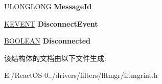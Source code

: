 \begin{DoxyCompactItemize}
\item 
\mbox{\label{struct___f_l_t___p_o_r_t___o_b_j_e_c_t_a63bb6f8d159bd8546356605329d488c9}} 
U\+L\+O\+N\+G\+L\+O\+NG {\bfseries Message\+Id}
\item 
\mbox{\label{struct___f_l_t___p_o_r_t___o_b_j_e_c_t_abd6e39342363b1d68cf348e3a508cd5b}} 
\hyperlink{struct___k_e_v_e_n_t}{K\+E\+V\+E\+NT} {\bfseries Disconnect\+Event}
\item 
\mbox{\label{struct___f_l_t___p_o_r_t___o_b_j_e_c_t_a1e7652fd1930907a48ddb5f18a067ca9}} 
\hyperlink{_processor_bind_8h_a112e3146cb38b6ee95e64d85842e380a}{B\+O\+O\+L\+E\+AN} {\bfseries Disconnected}
\end{DoxyCompactItemize}


该结构体的文档由以下文件生成\+:\begin{DoxyCompactItemize}
\item 
E\+:/\+React\+O\+S-\/0../drivers/filters/fltmgr/fltmgrint.\+h\end{DoxyCompactItemize}
